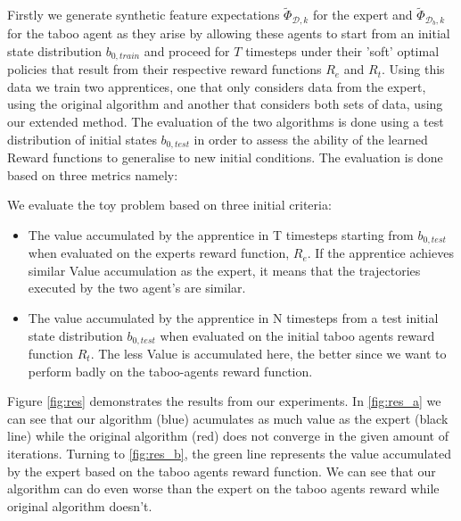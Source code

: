 \documentclass[conference]{IEEEtran}
\begin{document}
Firstly we generate synthetic feature expectations $\widetilde{\Phi}_{\mathcal{D},k}$ for the expert and $\widetilde{\Phi}_{\mathcal{D}_b,k}$ for the taboo agent as they arise by allowing these agents to start from an initial state distribution $b_{0,train}$ and proceed for $T$ timesteps under their 'soft' optimal policies that result from their respective reward functions $R_e$ and $R_t$. Using this data we train two apprentices, one that only considers data from the expert, using the original algorithm and another that considers both sets of data, using our extended method. The evaluation of the two algorithms is done using a test distribution of initial states $b_{0,test}$ in order to assess the ability of the learned Reward functions to generalise to new initial conditions. The evaluation is done based on three metrics namely:

		We evaluate the toy problem based on three initial criteria:
			\begin{itemize}
				\item The value accumulated by the apprentice in T timesteps starting from $b_{0,test}$ when evaluated on the experts reward function, $R_e$. If the apprentice achieves similar Value accumulation as the expert, it means that the trajectories executed by the two agent's are similar.

				\item The value accumulated by the apprentice in N timesteps from a test initial state distribution $b_{0,test}$ when evaluated on the initial taboo agents reward function $R_t$. The less Value is accumulated here, the better since we want to perform badly on the taboo-agents reward function.
				\end{itemize}
	
	Figure \ref{fig:res} demonstrates the results from our experiments. In \ref{fig:res_a} we can see that our algorithm (blue) acumulates as much value as the expert (black line) while the original algorithm (red) does not converge in the given amount of iterations. Turning to \ref{fig:res_b}, the green line represents the value accumulated by the expert based on the taboo agents reward function. We can see that our algorithm can do even worse than the expert on the taboo agents reward while original algorithm doesn't.
\end{document}

